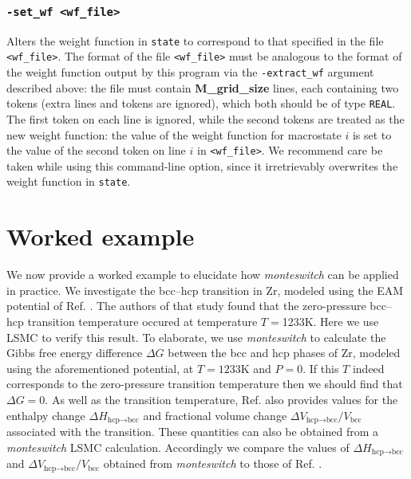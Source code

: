 \documentclass{report}
\begin{document}
\subsection{\texttt{-set\_wf <wf\_file>}}
Alters the weight function in \texttt{state} to correspond to that specified in the file \texttt{<wf\_file>}. The format of the file
\texttt{<wf\_file>} must be analogous to the format of the weight function output by this program via the \texttt{-extract\_wf} argument
described above: the file must contain \textbf{M\_grid\_size} lines, each containing two tokens (extra lines and tokens are ignored),
which both should be of type \texttt{REAL}. The first token on each line is ignored, while the second tokens are treated as the new
weight function: the value of the weight function for macrostate $i$ is set to the value of the second token on line $i$ in
\texttt{<wf\_file>}. We recommend care be taken while using this command-line option, since it irretrievably overwrites the weight 
function in \texttt{state}.


\chapter{Worked example}\label{chapter:example}
We now provide a worked example to elucidate how \emph{monteswitch} can be applied in practice. We investigate the bcc--hcp
transition in Zr, modeled using the EAM potential of Ref. \cite{Mendelev_2007}. The authors of that study found that the zero-pressure bcc--hcp
transition temperature occured at temperature $T=$1233K. Here we use LSMC to verify this result. To elaborate, we
use \emph{monteswitch} to calculate the Gibbs free energy difference $\Delta G$ between the bcc and hcp phases of Zr, modeled using 
the aforementioned potential, at $T=1233$K and $P=0$. If this $T$ indeed corresponds to the zero-pressure transition temperature then we should 
find that $\Delta G=0$. As well as the transition temperature, Ref. \cite{Mendelev_2007} also provides values for the enthalpy change 
$\Delta H_{\text{hcp$\to$bcc}}$ and fractional volume change $\Delta V_{\text{hcp$\to$bcc}}/V_{\text{bcc}}$ associated with the transition. These 
quantities can also be obtained from a \emph{monteswitch} LSMC calculation. Accordingly we compare the values of $\Delta H_{\text{hcp$\to$bcc}}$ and
$\Delta V_{\text{hcp$\to$bcc}}/V_{\text{bcc}}$ obtained from \emph{monteswitch} to those of Ref. \cite{Mendelev_2007}.
\end{document}
